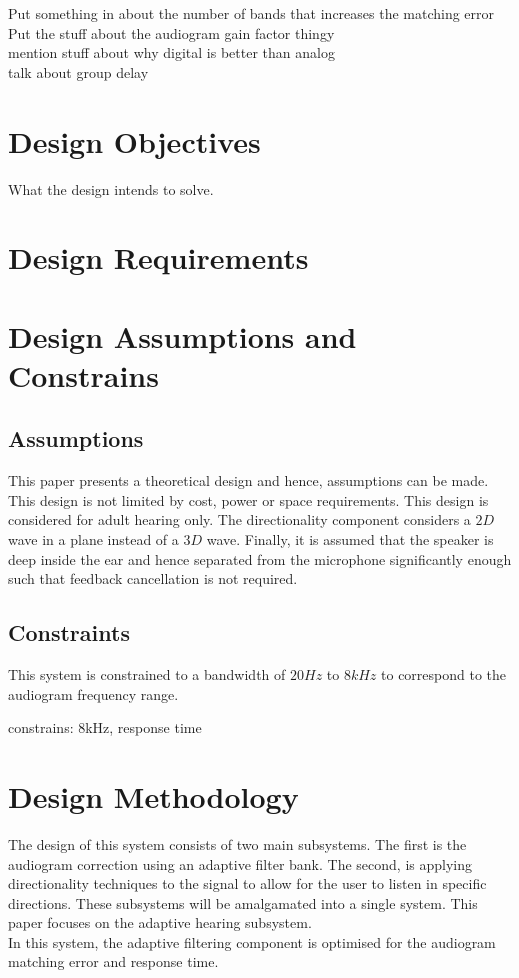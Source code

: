 \documentclass[12pt, onecolumn]{article}
\begin{document}
Put something in about the number of bands that increases the matching error
Put the stuff about the audiogram gain factor thingy\\
mention stuff about why digital is better than analog\\
talk about group delay
\section{Design Objectives}

\noindent What the design intends to solve.

\section{Design Requirements}


\section{Design Assumptions and Constrains}

\subsection{Assumptions}

\noindent This paper presents a theoretical design and hence, assumptions can be made. This design is not limited by cost, power or space requirements. This design is considered for adult hearing only. The directionality component considers a $2D$ wave in a plane instead of a $3D$ wave. Finally, it is assumed that the speaker is deep inside the ear and hence separated from the microphone significantly enough such that feedback cancellation is not required.

\subsection{Constraints}

\noindent This system is constrained to a bandwidth of $20Hz$ to $8kHz$ to correspond to the audiogram frequency range.

constrains: 8kHz, response time

\section{Design Methodology}

\noindent The design of this system consists of two main subsystems. The first is the audiogram correction using an adaptive filter bank. The second, is applying directionality techniques to the signal to allow for the user to listen in specific directions. These subsystems will be amalgamated into a single system. This paper focuses on the adaptive hearing subsystem.\\
\newline
\noindent In this system, the adaptive filtering component is optimised for the audiogram matching error and response time. 
\end{document}
